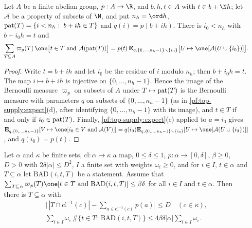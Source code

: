 \begin{lemma}\label{pf:top-supply:orbitsum}
Let $A$ be a finite abelian group, $p:A\to\R$, and $b,h,t\in A$ with $t\in b+\N h$; let $\mathcal A$ be a property of subsets
of $\N$, and put $n_h=\ord h$, $\operatorname{pat}(T)=\{i<n_h:\ b+ih\in T\}$ and $q(i)=p(b+ih)$. There is $i_0<n_h$ with
$b+i_0h=t$ and
\[
\sum_{T\subseteq A}\varpi_p(T)\,\one\big[t\in T\text{ and }\mathcal A(\topsupplypat(T))\big]
=p(t)\,\topsupplyE_{q,\{0,\dots,n_h-1\}\smallsetminus\{i_0\}}\big[U\mapsto\one[\mathcal A(U\cup\{i_0\})]\big].
\]
\end{lemma}

\begin{proof}
Write $t=b+ih$ and let $i_0$ be the residue of $i$ modulo $n_h$; then $b+i_0h=t$. The map $i\mapsto b+ih$ is injective on
$\{0,\dots,n_h-1\}$. Hence the image of the Bernoulli measure $\varpi_p$ on subsets of $A$ under $T\mapsto\operatorname{pat}(T)$ is
the Bernoulli measure with parameters $q$ on subsets of $\{0,\dots,n_h-1\}$ (as in \cref{pf:top-supply:expect}(d), after
identifying $\{0,\dots,n_h-1\}$ with its image), and $t\in T$ if and only if $i_0\in\operatorname{pat}(T)$. Finally,
\cref{pf:top-supply:expect}(c) applied to $a=i_0$ gives
$\topsupplyE_{q,\{0,\dots,n_h-1\}}[V\mapsto\one[i_0\in V\text{ and }\mathcal A(V)]]=q(i_0)\topsupplyE_{q,\{0,\dots,n_h-1\}\smallsetminus\{i_0\}}[U\mapsto\one[\mathcal A(U\cup\{i_0\})]]$,
and $q(i_0)=p(t)$.
\end{proof}

\begin{lemma}[Selection]\label{pf:top-supply:select}
Let $\alpha$ and $\kappa$ be finite sets, $\mathrm{cl}:\alpha\to\kappa$ a map, $0\le\delta\le1$, $p:\alpha\to[0,\delta]$,
$\beta\ge0$, $D>0$ with $2\delta|\alpha|\le D^2$, $I$ a finite set with weights $\omega_i\ge0$, and for $i\in I$, $t\in\alpha$
and $T\subseteq\alpha$ let $\mathrm{BAD}(i,t,T)$ be a statement. Assume that
$\sum_{T\subseteq\alpha}\varpi_p(T)\one[t\in T\text{ and }\mathrm{BAD}(i,t,T)]\le\beta\delta$ for all $i\in I$ and
$t\in\alpha$. Then there is $T\subseteq\alpha$ with
\begin{gather*}
\Big|\,|T\cap\mathrm{cl}^{-1}(c)|-\sum_{a\in\mathrm{cl}^{-1}(c)}p(a)\Big|\le D\quad(c\in\kappa),\\
\sum_{i\in I}\omega_i\,\#\{t\in T:\ \mathrm{BAD}(i,t,T)\}\le4\beta\delta|\alpha|\sum_{i\in I}\omega_i.
\end{gather*}
\end{lemma}

